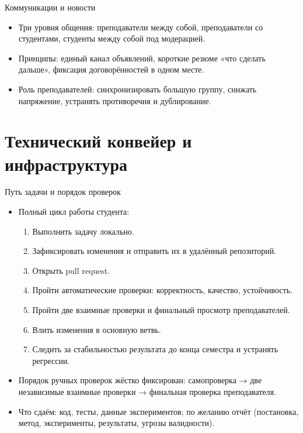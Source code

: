 \documentclass{beamer}
\begin{document}
\begin{frame}{Коммуникации и новости}
  \begin{itemize}
    \item Три уровня общения: преподаватели между собой, преподаватели со студентами, студенты между собой под модерацией.
    \item Принципы: единый канал объявлений, короткие резюме «что сделать дальше», фиксация договорённостей в одном месте.
    \item Роль преподавателей: синхронизировать большую группу, снижать напряжение, устранять противоречия и дублирование.
  \end{itemize}
\end{frame}

\section{Технический конвейер и инфраструктура}

\begin{frame}{Путь задачи и порядок проверок}
  \begin{itemize}
    \item Полный цикл работы студента:
      \begin{enumerate}[label=\arabic*.]
        \item Выполнить задачу локально.
        \item Зафиксировать изменения и отправить их в удалённый репозиторий.
        \item Открыть pull request.
        \item Пройти автоматические проверки: корректность, качество, устойчивость.
        \item Пройти две взаимные проверки и финальный просмотр преподавателей.
        \item Влить изменения в основную ветвь.
        \item Следить за стабильностью результата до конца семестра и устранять регрессии.
      \end{enumerate}
    \item Порядок ручных проверок жёстко фиксирован: самопроверка → две независимые взаимные проверки → финальная проверка преподавателя.
    \item Что сдаём: код, тесты, данные экспериментов; по желанию отчёт (постановка, метод, эксперименты, результаты, угрозы валидности).
  \end{itemize}
\end{frame}
\end{document}
